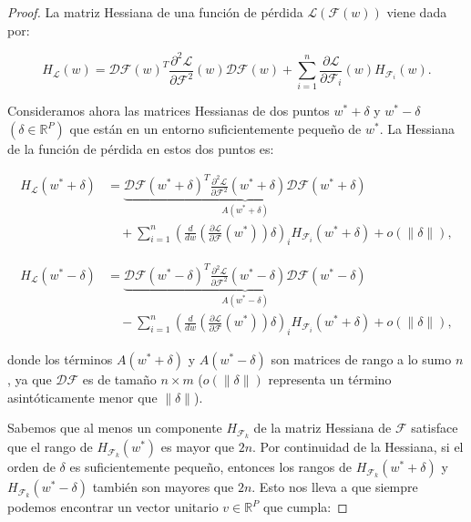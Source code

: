 \begin{proof}
    La matriz Hessiana de una función de pérdida $\mathcal{L}(\mathcal{F}(w))$ viene dada por:

    \[
        H_{\mathcal{L}}(w) = \mathcal{DF}(w)^T \frac{\partial^2 \mathcal{L}}{\partial \mathcal{F}^2}(w) \mathcal{DF}(w) + \sum_{i=1}^{n} \frac{\partial \mathcal{L}}{\partial \mathcal{F}_i}(w) H_{\mathcal{F}_i}(w).
    \]

    Consideramos ahora las matrices Hessianas de dos puntos $w^* + \delta $ y $w^* - \delta $ $(\delta \in \mathbb{R}^{P})$ que están en un entorno suficientemente pequeño de $w^*$. La Hessiana de la función de pérdida en estos dos puntos es:

    \begin{equation}\label{eq:non-convexity1}
        \begin{aligned}
            H_{\mathcal{L}}( w^* + \delta) &=  
            \underbrace{\mathcal{DF}( w^* + \delta)^T \frac{\partial^2 \mathcal{L}}{\partial \mathcal{F}^2}( w^* + \delta) \mathcal{DF}( w^* + \delta)}_{A( w^* + \delta)} \\
            &\quad + \sum_{i=1}^{n} \left( \frac{d}{d w} \left( \frac{\partial \mathcal{L}}{\partial \mathcal{F}}( w^*) \right) \delta \right)_i H_{\mathcal{F}_i}( w^* + \delta) + o(\|\delta\|),
        \end{aligned}
    \end{equation}
        
    \begin{align}
        H_{\mathcal{L}}( w^* - \delta) &=  
        \underbrace{\mathcal{DF}( w^* - \delta)^T \frac{\partial^2 \mathcal{L}}{\partial \mathcal{F}^2}( w^* - \delta) \mathcal{DF}( w^* - \delta)}_{A( w^* - \delta)} \nonumber \\
        &\quad - \sum_{i=1}^{n} \left( \frac{d}{d w} \left( \frac{\partial \mathcal{L}}{\partial \mathcal{F}}( w^*) \right) \delta \right)_i H_{\mathcal{F}_i}( w^* + \delta) + o(\|\delta\|),
    \end{align}
        

    donde los términos $ A( w^* + \delta) $ y $ A( w^* - \delta) $ son matrices de rango a lo sumo $ n $, ya que $ \mathcal{DF} $ es de tamaño $ n \times m $ ($o(\|\delta\|)$ representa un término asintóticamente menor que $\| \delta \|$).

    Sabemos que al menos un componente $ H_{\mathcal{F}_k} $ de la matriz Hessiana de $ \mathcal{F} $ satisface que el rango de $ H_{\mathcal{F}_k}( w^*) $ es mayor que $ 2n $. Por continuidad de la Hessiana, si el orden de $ \delta $ es suficientemente pequeño, entonces los rangos de $ H_{\mathcal{F}_k}( w^* + \delta) $ y $ H_{\mathcal{F}_k}( w^* - \delta) $ también son mayores que $ 2n $. Esto nos lleva a que siempre podemos encontrar un vector unitario $v \in \mathbb{R}^P $ que cumpla:


\end{proof}
